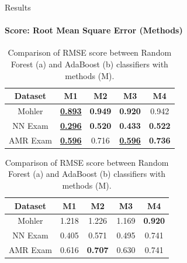 \documentclass[aspectratio=169]{beamer}
\begin{document}
\begin{frame}{Results}
\framesubtitle{Score: Root Mean Square Error (Methods)}
\begin{table}
	\begin{subtable}[c]{0.6\textwidth}
		\centering
		\begin{tabular}{|c|c|c|c|c|}
			\hline
			Dataset & M1 & M2 & M3 & M4 \\
			\hline
			Mohler & \underline{\textbf{0.893}}  &\textbf{0.949} &\textbf{0.920} &0.942 \\
			\hline
			NN Exam &\underline{\textbf{0.296}} &\textbf{0.520} &\textbf{0.433} &\textbf{0.522} \\
			\hline
			AMR Exam &\underline{\textbf{0.596}} &0.716 &\underline{\textbf{0.596}} & \textbf{0.736} \\
			\hline
		\end{tabular}
		\subcaption{}
	\end{subtable}
	\begin{subtable}[c]{0.6\textwidth}
		\centering
		\begin{tabular}{|c|c|c|c|c|}
			\hline
			Dataset & M1 & M2 & M3 & M4 \\
			\hline
			Mohler &1.218  &1.226 &1.169 &\textbf{0.920} \\
			\hline
			NN Exam &0.405 &0.571 &{0.495} &0.741 \\
			\hline
			AMR Exam &0.616 &\textbf{0.707} &0.630 &{0.741} \\
			\hline
		\end{tabular}	
		\subcaption{}
	\end{subtable}
	\caption{Comparison of RMSE score between Random Forest (a) and AdaBoost (b) classifiers with methods (M).}
\end{table}
\end{frame}
\end{document}
